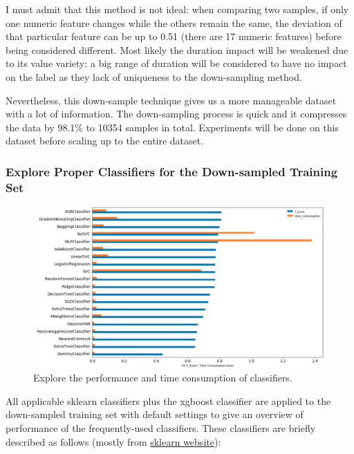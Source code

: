 \documentclass[a4paper]{article}
\begin{document}
			I must admit that this method is not ideal: when comparing two samples, if only one numeric feature changes while the others remain the same, the deviation of that particular feature can be up to 0.51 (there are 17 numeric features) before being considered different. Most likely the duration impact will be weakened due to its value variety: a big range of duration will be considered to have no impact on the label as they lack of uniqueness to the down-sampling method. 
			
			Nevertheless, this down-sample technique gives us a more manageable dataset with a lot of information. The down-sampling process is quick and it compresses the data by 98.1\% to 10354 samples in total. Experiments will be done on this dataset before scaling up to the entire dataset.

			\subsubsection{Explore Proper Classifiers for the Down-sampled Training Set}
			
			\begin{figure}
				\centering
				\includegraphics[width=1\textwidth]{Classifiers.png}	\caption{\label{fig:classifiers}Explore the performance and time consumption of classifiers.}	
			\end{figure}	

			All applicable sklearn classifiers plus the xgboost classifier are applied to the down-sampled training set with default settings to give an overview of performance of the frequently-used classifiers. These classifiers are briefly described as follows (mostly from \href{http://scikit-learn.org/stable/supervised_learning.html}{sklearn website}):
			
\end{document}
